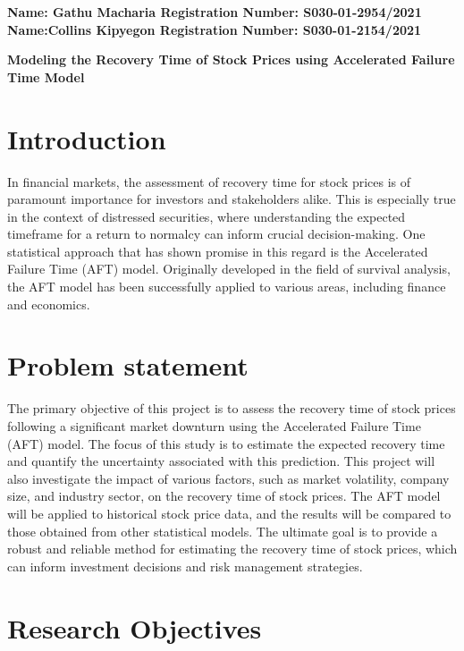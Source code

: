 \documentclass[twoside,a4paper,12pt]{article}
\begin{document}
	
	\begin{flushleft} 
			\large{\bf{Name: Gathu Macharia     Registration Number: S030-01-2954/2021\\
					   Name:Collins Kipyegon        Registration Number: S030-01-2154/2021\\}} \vspace*{0.75in}
	\end{flushleft}
	
	\begin{center} \Large{ \bf{Modeling the Recovery Time of Stock Prices using Accelerated Failure Time Model }} \end{center}	


\section*{Introduction}In financial markets, the assessment of recovery time for stock prices is of paramount importance for investors and stakeholders alike. This is especially true in the context of distressed securities, where understanding the expected timeframe for a return to normalcy can inform crucial decision-making. One statistical approach that has shown promise in this regard is the Accelerated Failure Time (AFT) model. Originally developed in the field of survival analysis, the AFT model has been successfully applied to various areas, including finance and economics.

\section*{Problem statement}The primary objective of this project is to assess the recovery time of stock prices following a significant market downturn using the Accelerated Failure Time (AFT) model. The focus of this study is to estimate the expected recovery time and quantify the uncertainty associated with this prediction. This project will also investigate the impact of various factors, such as market volatility, company size, and industry sector, on the recovery time of stock prices. The AFT model will be applied to historical stock price data, and the results will be compared to those obtained from other statistical models. The ultimate goal is to provide a robust and reliable method for estimating the recovery time of stock prices, which can inform investment decisions and risk management strategies.


\section*{Research Objectives} 
\end{document}
